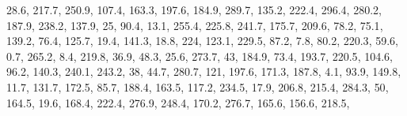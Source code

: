 \documentclass[]{book}
\newenvironment{Shaded}{\begin{snugshade}}{\end{snugshade}}
\newcommand{\DecValTok}[1]{\textcolor[rgb]{0.00,0.00,0.81}{#1}}
\newcommand{\FloatTok}[1]{\textcolor[rgb]{0.00,0.00,0.81}{#1}}
\newcommand{\NormalTok}[1]{#1}
\begin{document}
\begin{Shaded}
\begin{Highlighting}[]
    \FloatTok{28.6}\NormalTok{, }\FloatTok{217.7}\NormalTok{, }\FloatTok{250.9}\NormalTok{, }\FloatTok{107.4}\NormalTok{, }\FloatTok{163.3}\NormalTok{, }\FloatTok{197.6}\NormalTok{, }\FloatTok{184.9}\NormalTok{, }\FloatTok{289.7}\NormalTok{, }\FloatTok{135.2}\NormalTok{, }\FloatTok{222.4}\NormalTok{, }\FloatTok{296.4}\NormalTok{, }
    \FloatTok{280.2}\NormalTok{, }\FloatTok{187.9}\NormalTok{, }\FloatTok{238.2}\NormalTok{, }\FloatTok{137.9}\NormalTok{, }\DecValTok{25}\NormalTok{, }\FloatTok{90.4}\NormalTok{, }\FloatTok{13.1}\NormalTok{, }\FloatTok{255.4}\NormalTok{, }\FloatTok{225.8}\NormalTok{, }\FloatTok{241.7}\NormalTok{, }\FloatTok{175.7}\NormalTok{, }
    \FloatTok{209.6}\NormalTok{, }\FloatTok{78.2}\NormalTok{, }\FloatTok{75.1}\NormalTok{, }\FloatTok{139.2}\NormalTok{, }\FloatTok{76.4}\NormalTok{, }\FloatTok{125.7}\NormalTok{, }\FloatTok{19.4}\NormalTok{, }\FloatTok{141.3}\NormalTok{, }\FloatTok{18.8}\NormalTok{, }\DecValTok{224}\NormalTok{, }\FloatTok{123.1}\NormalTok{, }\FloatTok{229.5}\NormalTok{, }
    \FloatTok{87.2}\NormalTok{, }\FloatTok{7.8}\NormalTok{, }\FloatTok{80.2}\NormalTok{, }\FloatTok{220.3}\NormalTok{, }\FloatTok{59.6}\NormalTok{, }\FloatTok{0.7}\NormalTok{, }\FloatTok{265.2}\NormalTok{, }\FloatTok{8.4}\NormalTok{, }\FloatTok{219.8}\NormalTok{, }\FloatTok{36.9}\NormalTok{, }\FloatTok{48.3}\NormalTok{, }\FloatTok{25.6}\NormalTok{, }
    \FloatTok{273.7}\NormalTok{, }\DecValTok{43}\NormalTok{, }\FloatTok{184.9}\NormalTok{, }\FloatTok{73.4}\NormalTok{, }\FloatTok{193.7}\NormalTok{, }\FloatTok{220.5}\NormalTok{, }\FloatTok{104.6}\NormalTok{, }\FloatTok{96.2}\NormalTok{, }\FloatTok{140.3}\NormalTok{, }\FloatTok{240.1}\NormalTok{, }\FloatTok{243.2}\NormalTok{, }
    \DecValTok{38}\NormalTok{, }\FloatTok{44.7}\NormalTok{, }\FloatTok{280.7}\NormalTok{, }\DecValTok{121}\NormalTok{, }\FloatTok{197.6}\NormalTok{, }\FloatTok{171.3}\NormalTok{, }\FloatTok{187.8}\NormalTok{, }\FloatTok{4.1}\NormalTok{, }\FloatTok{93.9}\NormalTok{, }\FloatTok{149.8}\NormalTok{, }\FloatTok{11.7}\NormalTok{, }\FloatTok{131.7}\NormalTok{, }
    \FloatTok{172.5}\NormalTok{, }\FloatTok{85.7}\NormalTok{, }\FloatTok{188.4}\NormalTok{, }\FloatTok{163.5}\NormalTok{, }\FloatTok{117.2}\NormalTok{, }\FloatTok{234.5}\NormalTok{, }\FloatTok{17.9}\NormalTok{, }\FloatTok{206.8}\NormalTok{, }\FloatTok{215.4}\NormalTok{, }\FloatTok{284.3}\NormalTok{, }\DecValTok{50}\NormalTok{, }
    \FloatTok{164.5}\NormalTok{, }\FloatTok{19.6}\NormalTok{, }\FloatTok{168.4}\NormalTok{, }\FloatTok{222.4}\NormalTok{, }\FloatTok{276.9}\NormalTok{, }\FloatTok{248.4}\NormalTok{, }\FloatTok{170.2}\NormalTok{, }\FloatTok{276.7}\NormalTok{, }\FloatTok{165.6}\NormalTok{, }\FloatTok{156.6}\NormalTok{, }\FloatTok{218.5}\NormalTok{, }

\end{Highlighting}
\end{Shaded}
\end{document}
